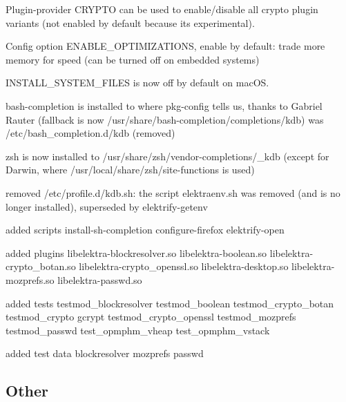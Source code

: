 \begin{DoxyItemize}
\item Plugin-\/provider {\ttfamily C\+R\+Y\+P\+TO} can be used to enable/disable all crypto plugin variants (not enabled by default because its experimental).
\item Config option {\ttfamily E\+N\+A\+B\+L\+E\+\_\+\+O\+P\+T\+I\+M\+I\+Z\+A\+T\+I\+O\+NS}, enable by default\+: trade more memory for speed (can be turned off on embedded systems)
\item {\ttfamily I\+N\+S\+T\+A\+L\+L\+\_\+\+S\+Y\+S\+T\+E\+M\+\_\+\+F\+I\+L\+ES} is now off by default on mac\+OS.
\item bash-\/completion is installed to where pkg-\/config tells us, thanks to Gabriel Rauter (fallback is now {\ttfamily /usr/share/bash-\/completion/completions/kdb}) was {\ttfamily /etc/bash\+\_\+completion.d/kdb} (removed)
\item zsh is now installed to {\ttfamily /usr/share/zsh/vendor-\/completions/\+\_\+kdb} (except for Darwin, where {\ttfamily /usr/local/share/zsh/site-\/functions} is used)
\item removed {\ttfamily /etc/profile.d/kdb.\+sh}\+: the script {\ttfamily elektraenv.\+sh} was removed (and is no longer installed), superseded by {\ttfamily elektrify-\/getenv}
\item added scripts install-\/sh-\/completion configure-\/firefox elektrify-\/open
\item added plugins libelektra-\/blockresolver.\+so libelektra-\/boolean.\+so libelektra-\/crypto\+\_\+botan.\+so libelektra-\/crypto\+\_\+openssl.\+so libelektra-\/desktop.\+so libelektra-\/mozprefs.\+so libelektra-\/passwd.\+so
\item added tests testmod\+\_\+blockresolver testmod\+\_\+boolean testmod\+\_\+crypto\+\_\+botan testmod\+\_\+crypto gcrypt testmod\+\_\+crypto\+\_\+openssl testmod\+\_\+mozprefs testmod\+\_\+passwd test\+\_\+opmphm\+\_\+vheap test\+\_\+opmphm\+\_\+vstack
\item added test data blockresolver mozprefs passwd
\end{DoxyItemize}

\subsection*{Other}


